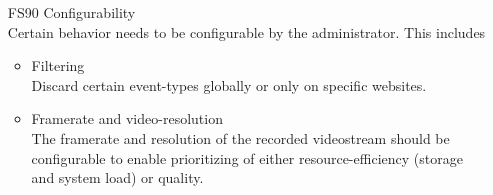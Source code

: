 \begin{itemize}
\item[FS90] Configurability\\Certain behavior needs to be configurable by the administrator. This includes
\begin{itemize} %
\item Filtering\\Discard certain event-types globally or only on specific websites.
\item Framerate and video-resolution\\The framerate and resolution of the recorded videostream should be configurable to enable prioritizing of either resource-efficiency (storage and system load) or quality.
\end{itemize}
\end{itemize}

